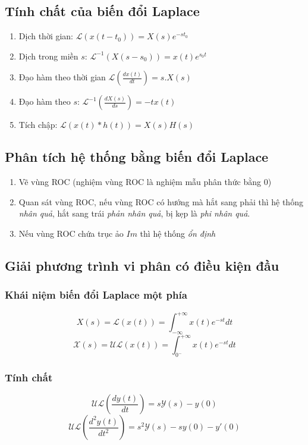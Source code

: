 \documentclass{article}
\begin{document}
\subsection{Tính chất của biến đổi Laplace}
\begin{enumerate}
    \item Dịch thời gian: $\mathscr{L}(x(t-t_{0}))=X(s)e^{-st_{0}}$
    \item Dịch trong miền $s$: $\mathscr{L}^{-1}(X(s-s_{0}))=x(t)e^{s_{0}t}$
    \item Đạo hàm theo thời gian $\mathscr{L}\left(\frac{dx(t)}{dt}\right)=s.X(s)$
    \item Đạo hàm theo $s$: $\mathscr{L}^{-1}\left(\frac{dX(s)}{ds}\right)=-tx(t)$
    \item Tích chập: $\mathscr{L}(x(t)*h(t))=X(s)H(s)$
\end{enumerate}
\subsection{Phân tích hệ thống bằng biến đổi Laplace}
\begin{enumerate}
    \item Vẽ vùng ROC (nghiệm vùng ROC là nghiệm mẫu phân thức bằng 0)
    \item Quan sát vùng ROC, nếu vùng ROC có hướng mà hắt sang phải thì hệ thống \textit{nhân quả}, hắt sang trái \textit{phản nhân quả}, bị kẹp là \textit{phi nhân quả}.
    \item Nếu vùng ROC chứa trục ảo $Im$ thì hệ thống \textit{ổn định}
\end{enumerate}
\subsection{Giải phương trình vi phân có điều kiện đầu}
\subsubsection{Khái niệm biến đổi Laplace một phía}
$$X(s)=\mathscr{L}(x(t))=\int_{-\infty}^{+\infty}x(t)e^{-st}dt$$
$$\mathscr{X}(s)=\mathscr{UL}(x(t))=\int_{0^{-}}^{+\infty}x(t)e^{-st}dt$$
\subsubsection{Tính chất}
$$\mathscr{UL}\left(\frac{dy(t)}{dt}\right)=s\mathscr{Y}(s)-y(0)$$
$$\mathscr{UL}\left(\frac{d^{2}y(t)}{dt^{2}}\right)=s^{2}\mathscr{Y}(s)-sy(0)-y'(0)$$
\end{document}
